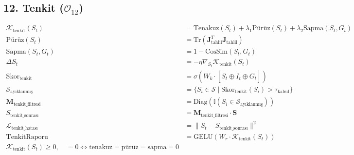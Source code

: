 \documentclass[11pt, a4paper]{article}
\begin{document}
\subsection{12. Tenkit ($\mathcal{O}_{12}$)}
\begin{align}
\mathcal{K}_{\text{tenkit}}(S_t) &= \text{Tenakuz}(S_t) + \lambda_1 \text{Pürüz}(S_t) + \lambda_2 \text{Sapma}(S_t, G_t) \\
\text{Pürüz}(S_t) &= \text{Tr}(\mathbf{J}_{\text{tahlil}}^T \mathbf{J}_{\text{tahlil}}) \\
\text{Sapma}(S_t, G_t) &= 1 - \text{CosSim}(S_t, G_t) \\
\Delta S_t &= -\eta \nabla_{S_t} \mathcal{K}_{\text{tenkit}}(S_t) \\
\text{Skor}_{\text{tenkit}} &= \sigma\left( W_k \cdot [S_t \oplus \dot{I}_t \oplus G_t] \right) \\
\mathcal{S}_{\text{ayıklanmış}} &= \{ S_i \in \mathcal{S} \mid \text{Skor}_{\text{tenkit}}(S_i) > \tau_{\text{kabul}} \} \\
\mathbf{M}_{\text{tenkit\_filtresi}} &= \text{Diag}(\mathbb{I}(S_i \in \mathcal{S}_{\text{ayıklanmış}})) \\
S_{\text{tenkit\_sonrası}} &= \mathbf{M}_{\text{tenkit\_filtresi}} \cdot \mathbf{S} \\
\mathcal{L}_{\text{tenkit\_hatası}} &= \| S_t - S_{\text{tenkit\_sonrası}} \|^2 \\
\text{TenkitRaporu} &= \text{GELU}(W_r \cdot \mathcal{K}_{\text{tenkit}}(S_t)) \\
\mathcal{K}_{\text{tenkit}}(S_t) \ge 0, \quad = 0 \iff \text{tenakuz}=\text{pürüz}=\text{sapma}=0
\end{align}
\end{document}
